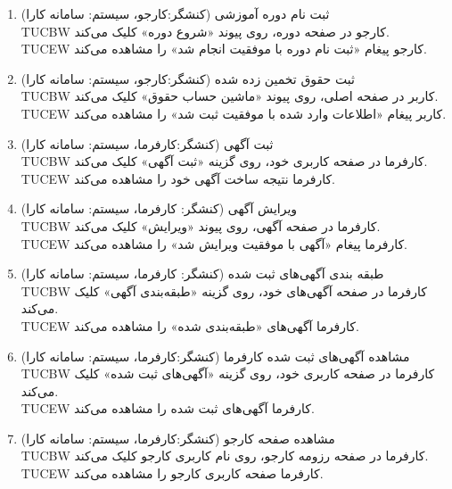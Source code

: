 \documentclass[12pt]{article}
\begin{document}
\begin{enumerate}
		\item
		ثبت نام دوره‌ آموزشی (کنشگر:‌کارجو، سیستم: سامانه کارا)\\
		TUCBW کارجو در صفحه دوره، روی پیوند «شروع دوره» کلیک می‌کند.\\
		TUCEW کارجو پیغام «ثبت نام دوره با موفقیت انجام شد» را مشاهده می‌کند.\\

		\item
		ثبت حقوق تخمین زده شده (کنشگر:‌کارجو، سیستم: سامانه کارا)\\
		TUCBW کاربر در صفحه اصلی، روی پیوند «ماشین حساب حقوق» کلیک می‌کند.\\
		TUCEW کاربر پیغام «اطلاعات وارد شده با موفقیت ثبت شد» را مشاهده می‌کند.\\

		\item
		ثبت آگهی (کنشگر:‌کارفرما، سیستم: سامانه کارا)\faStar\\
		TUCBW کارفرما در صفحه کاربری خود، روی گزینه «ثبت آگهی» کلیک می‌کند.\\
		TUCEW کارفرما نتیجه ساخت آگهی خود را مشاهده می‌کند.\\

		\item
		ویرایش آگهی (کنشگر:‌ کارفرما، سیستم: سامانه کارا)\\
		TUCBW کارفرما در صفحه آگهی، روی پیوند «ویرایش» کلیک می‌کند.\\
		TUCEW کارفرما پیغام «آگهی با موفقیت ویرایش شد» را مشاهده می‌کند.\\

		\item
		طبقه بندی آگهی‌های ثبت شده (کنشگر:‌ کارفرما، سیستم: سامانه کارا)\\
		TUCBW کارفرما در صفحه آگهی‌های خود، روی گزینه «طبقه‌بندی آگهی» کلیک می‌کند.\\
		TUCEW کارفرما آگهی‌های «طبقه‌بندی شده» را مشاهده می‌کند.\\

		\item
		مشاهده آگهی‌های ثبت شده کارفرما (کنشگر:‌کارفرما، سیستم: سامانه کارا)\\
		TUCBW کارفرما در صفحه کاربری خود، روی گزینه «آگهی‌های ثبت شده» کلیک می‌کند.\\
		TUCEW کارفرما آگهی‌های ثبت شده را مشاهده می‌کند.\\

		\item
		مشاهده صفحه کارجو (کنشگر:‌کارفرما، سیستم: سامانه کارا)\\
		TUCBW کارفرما در صفحه رزومه کارجو، روی نام کاربری کارجو کلیک می‌کند.\\
		TUCEW کارفرما صفحه کاربری کارجو را مشاهده می‌کند.\\


\end{enumerate}
\end{document}

